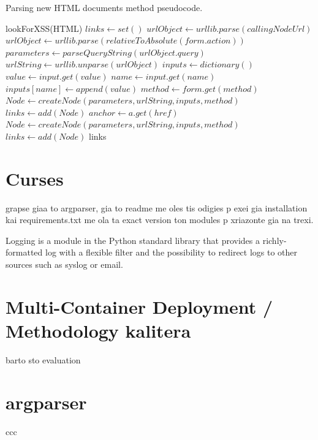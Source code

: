 \begin{algorithm}
 
 \caption{Parsing new HTML documents method pseudocode.}
 \label{alg:parser_pseudocode}
 
 \begin{algorithmic}
	\STATE lookForXSS(HTML)  
	\STATE $links \leftarrow set()$ 
 			\STATE $urlObject \leftarrow urllib.parse(callingNodeUrl)$
		 \ELSE 
 			\STATE $urlObject \leftarrow urllib.parse(relativeToAbsolute(form.action))$
		 \ENDIF
		\STATE $parameters \leftarrow parseQueryString(urlObject.query)$ 
		\STATE $urlString \leftarrow urllib.unparse(urlObject)$ 
		\STATE $inputs \leftarrow dictionary()$ 
			\STATE $value \leftarrow input.get(value)$			 
	 		\STATE $name \leftarrow input.get(name)$	
	 		\STATE $inputs[name] \leftarrow append(value)$	 
		\ENDFOR
		\STATE $method \leftarrow form.get(method)$	
		\STATE $Node \leftarrow createNode(parameters, urlString, inputs, method)$	
		\STATE $links \leftarrow add(Node)$
			\STATE $anchor \leftarrow a.get(href)$			 
		\ENDFOR
		\STATE $Node \leftarrow createNode(parameters, urlString, inputs, method)$	
		\STATE $links \leftarrow add(Node)$
	\ENDFOR
	\RETURN links
 \end{algorithmic}
 
\end{algorithm}


\section{Curses}

grapse giaa to argparser, gia to readme me oles tis odigies p exei gia installation kai requirements.txt me ola ta exact version ton modules p xriazonte gia na trexi.

Logging is a module in the Python standard library that provides a richly-formatted log with a flexible filter and the possibility to redirect logs to other sources such as syslog or email.

\section{Multi-Container Deployment / Methodology kalitera}
barto sto evaluation


\section{argparser}
ccc